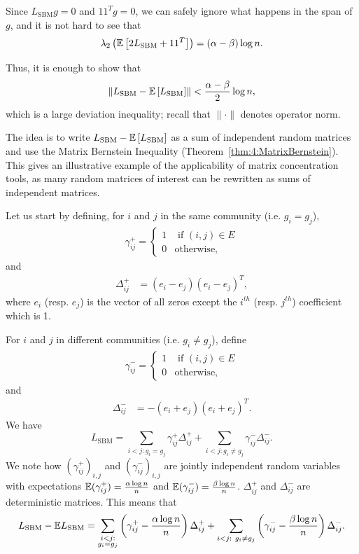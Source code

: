 Since $L_{\text{SBM}}g=0$ and $11^Tg = 0$, we can safely ignore what happens in the span of $g$, and it is not hard to see that
\[
\lambda_2 \left( \mathbb{E}\left[ 2 L_{\text{SBM}} +11^T \right] \right) = (\alpha-\beta) \log n.
\]


Thus, it is enough to show that
\begin{equation}\label{largedeviations_matrix}
\left\|  L_\text{SBM}  - \mathbb{E}\left[ L_\text{SBM} \right] \right\| < \frac{\alpha-\beta}2 \log n,
\end{equation}
which is a large deviation inequality; recall that $\|\cdot\|$ denotes operator norm.

The idea is to write $L_\text{SBM}  - \mathbb{E}\left[ L_\text{SBM} \right]$ as a sum of  independent random matrices and use the Matrix Bernstein Inequality (Theorem~\ref{thm:4:MatrixBernstein}). This gives an illustrative example of the applicability of matrix concentration tools, as many random matrices of interest can be rewritten as sums of independent matrices.

Let us start by defining, for $i$ and $j$ in the same community (i.e. $g_i=g_j$), 
\begin{align*}
\gamma^+_{ij}=\begin{cases} 1 & \text{ if } (i,j)\in E \\ 0 & \text{otherwise,}\end{cases}
\end{align*}
and
\begin{align*}
\Delta^+_{ij}&= (e_i-e_j)(e_i-e_j)^T,
\end{align*}
where $e_i$ (resp. $e_j$) is the vector of all zeros except the $i^{th}$ (resp. $j^{th}$) coefficient which is 1.

For $i$ and $j$ in different communities (i.e. $g_i \neq g_j$), define 
\begin{align*}
\gamma^-_{ij}=\begin{cases} 1 & \text{ if } (i,j)\in E \\ 0 & \text{otherwise,} \end{cases}
\end{align*}
and
\begin{align*}
\Delta^-_{ij}&= -(e_i+e_j)(e_i+e_j)^T.
\end{align*}
 We have
\[
L_\text{SBM} = \sum_{i<j: g_i=g_j} \gamma^+_{ij} \Delta^+_{ij}+\sum_{i<j: g_i\neq g_j} \gamma^-_{ij} \Delta^-_{ij}.
\]
We note how $(\gamma_{ij}^+)_{i,j}$ and  $(\gamma_{ij}^-)_{i,j}$ are jointly independent random variables with expectations $\mathbb{E} (\gamma_{ij}^+) = \frac{\alpha\log n}{n}$ and $\mathbb{E} (\gamma_{ij}^-)= \frac{\beta\log n}{n}$. $ \Delta^+_{ij}$ and $\Delta^-_{ij}$ are deterministic matrices. This means that
\[
L_\text{SBM} - \EE L_\text{SBM} = \sum_{\substack{i<j:\\ g_i=g_j}} \left(\gamma^+_{ij} - \frac{\alpha\log n}{n}\right) \Delta^+_{ij}+\sum_{\substack{i<j:\ g_i\neq g_j}} \left(\gamma^-_{ij} - \frac{\beta\log n}{n} \right) \Delta^-_{ij}.
\]

